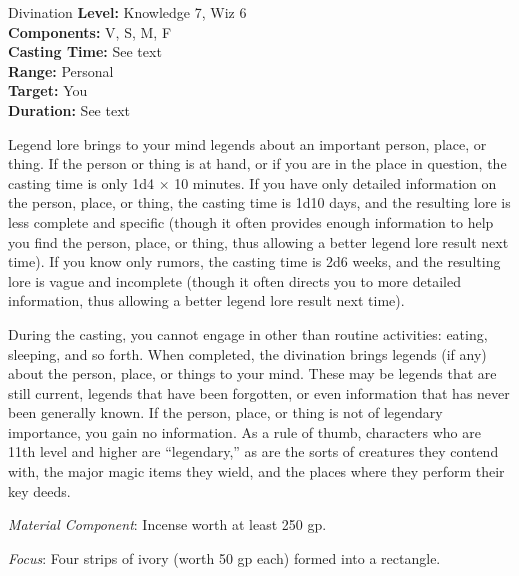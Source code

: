 {Divination}
{
	\textbf{Level:}
	Knowledge 7, Wiz 6\\
	\textbf{Components:}
	V, S, M, F\\
	\textbf{Casting Time:}
	See text\\
	\textbf{Range:}
	Personal\\
	\textbf{Target:}
	You\\
	\textbf{Duration:}
	See text\\
}
{
	Legend lore brings to your mind legends about an important person, place, or thing. If the person or thing is at hand, or if you are in the place in question, the casting time is only 1d4 $\times$ 10 minutes. If you have only detailed information on the person, place, or thing, the casting time is 1d10 days, and the resulting lore is less complete and specific (though it often provides enough information to help you find the person, place, or thing, thus allowing a better legend lore result next time). If you know only rumors, the casting time is 2d6 weeks, and the resulting lore is vague and incomplete (though it often directs you to more detailed information, thus allowing a better legend lore result next time).

	During the casting, you cannot engage in other than routine activities: eating, sleeping, and so forth. When completed, the divination brings legends (if any) about the person, place, or things to your mind. These may be legends that are still current, legends that have been forgotten, or even information that has never been generally known. If the person, place, or thing is not of legendary importance, you gain no information. As a rule of thumb, characters who are 11th level and higher are ``legendary,'' as are the sorts of creatures they contend with, the major magic items they wield, and the places where they perform their key deeds.

	\textit{Material Component}:
	Incense worth at least 250 gp.

	\textit{Focus}:
	Four strips of ivory (worth 50 gp each) formed into a rectangle.

}
